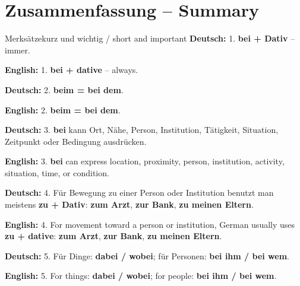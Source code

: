 \documentclass[a4paper,11pt]{article}
\newcommand{\GermanText}[1]{\textbf{Deutsch: }#1\par}
\newcommand{\EnglishText}[1]{{\small\color{SoftGray}\textbf{English: }#1\par}}
\begin{document}
   \section{Zusammenfassung -- Summary}
                                                \begin{grammarentry}{Merksätze}{kurz und wichtig / short and important}
                                                   \GermanText{1. \textbf{bei + Dativ} -- immer.}
                                                   \EnglishText{1. \textbf{bei + dative} -- always.}
                                                   \GermanText{2. \textbf{beim = bei dem}.}
                                                   \EnglishText{2. \textbf{beim = bei dem}.}
                                                   \GermanText{3. \textbf{bei} kann Ort, Nähe, Person, Institution, Tätigkeit, Situation, Zeitpunkt oder Bedingung ausdrücken.}
                                                   \EnglishText{3. \textbf{bei} can express location, proximity, person, institution, activity, situation, time, or condition.}
                                                   \GermanText{4. Für Bewegung zu einer Person oder Institution benutzt man meistens \textbf{zu + Dativ}: \textbf{zum Arzt}, \textbf{zur Bank}, \textbf{zu meinen Eltern}.}
                                                   \EnglishText{4. For movement toward a person or institution, German usually uses \textbf{zu + dative}: \textbf{zum Arzt}, \textbf{zur Bank}, \textbf{zu meinen Eltern}.}
                                                   \GermanText{5. Für Dinge: \textbf{dabei / wobei}; für Personen: \textbf{bei ihm / bei wem}.}
                                                   \EnglishText{5. For things: \textbf{dabei / wobei}; for people: \textbf{bei ihm / bei wem}.}
                                                \end{grammarentry}
\end{document}

